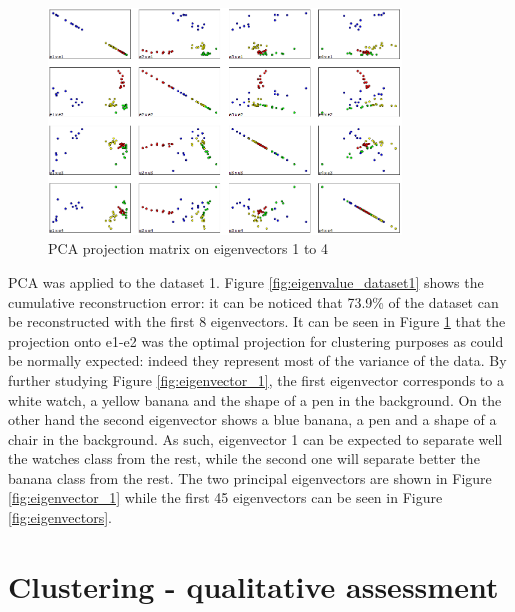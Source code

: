 \documentclass[a4paper,10pt]{article}
\begin{document}
\begin{figure}[H]
  \centering
  \includegraphics[height = 6cm]{pictures/PCA_projections}
  \caption{PCA projection matrix on eigenvectors 1 to 4}
  \label{fig:PCA_matrix}
\end{figure}

PCA was applied to the dataset 1. Figure \ref{fig:eigenvalue_dataset1} shows the cumulative reconstruction error: it can be noticed that 73.9\% of the dataset can be reconstructed with the first 8 eigenvectors. 
It can be seen in Figure \ref{fig:PCA_matrix} that the projection onto e1-e2 was the optimal projection for clustering purposes as could be normally expected: indeed they represent most of the variance of the data. By further studying Figure \ref{fig:eigenvector_1}, the first eigenvector corresponds to a white watch, a yellow banana and the shape of a pen in the background. On the other hand the second eigenvector shows a blue banana, a pen and a shape of a chair in the background. As such, eigenvector 1 can be expected to separate well the watches class from the rest, while the second one will separate better the banana class from the rest. The two principal eigenvectors are shown in Figure \ref{fig:eigenvector_1} while the first 45 eigenvectors can be seen in Figure \ref{fig:eigenvectors}.

\section{Clustering - qualitative assessment}
\end{document}
